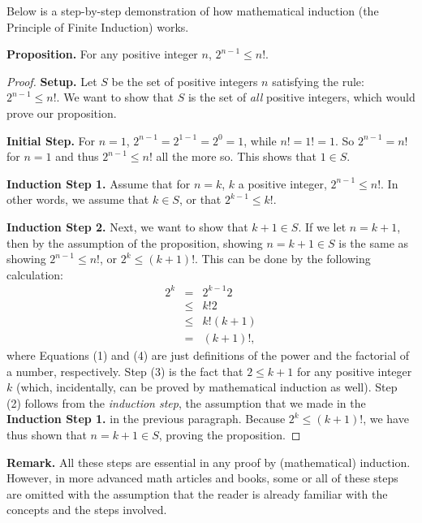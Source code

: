 \documentclass[12pt]{article}
\begin{document}
Below is a step-by-step demonstration of how mathematical induction (the Principle of Finite Induction) works.

\textbf{Proposition.}  For any positive integer $n$, $2^{n-1}\le n!$.

\begin{proof}  

\textbf{Setup.}  Let $S$ be the set of positive integers $n$ satisfying the rule: $2^{n-1}\le n!$.  We want to show that $S$ is the set of \emph{all} positive integers, which would prove our proposition.

\textbf{Initial Step.}  For $n=1$, $2^{n-1}=2^{1-1}=2^0=1$, while $n!=1!=1$.  So $2^{n-1}=n!$ for $n=1$ and thus $2^{n-1}\le n!$ all the more so.  This shows that $1\in S$.

\textbf{Induction Step 1.}  Assume that for $n=k$, $k$ a positive integer, $2^{n-1}\le n!$.  In other words, we assume that $k\in S$, or that $2^{k-1}\le k!$.

\textbf{Induction Step 2.}  Next, we want to show that $k+1\in S$.  If we let $n=k+1$, then by the assumption of the proposition, showing $n=k+1\in S$ is the same as showing $2^{n-1}\le n!$, or $2^k\le (k+1)!$.  This can be done by the following calculation:
\begin{eqnarray}
2^k &=& 2^{k-1}2\\ &\le& k!2\\ &\le& k!(k+1)\\ &=& (k+1)!,
\end{eqnarray}
where Equations (1) and (4) are just definitions of the power and the factorial of a number, respectively.  Step (3) is the fact that $2\le k+1$ for any positive integer $k$ (which, incidentally, can be proved by mathematical induction as well).  Step (2) follows from the \emph{induction step}, the assumption that we made in the \textbf{Induction Step 1.} in the previous paragraph.  Because $2^k\le (k+1)!$, we have thus shown that $n=k+1\in S$, proving the proposition.
\end{proof}

\textbf{Remark.} All these steps are essential in any proof by (mathematical) induction.  However, in more advanced math articles and books, some or all of these steps are omitted with the assumption that the reader is already familiar with the concepts and the steps involved.
\end{document}
